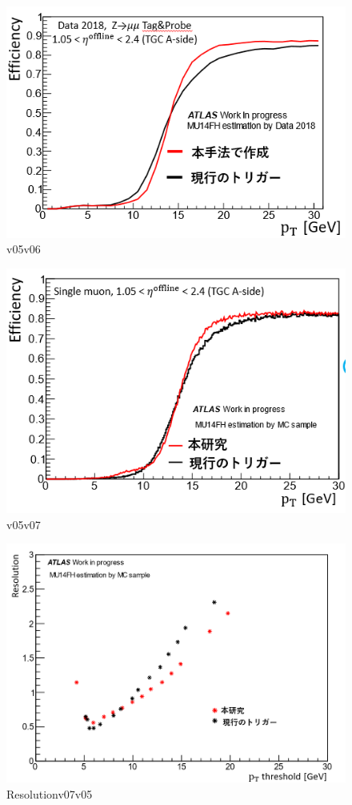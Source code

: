 \begin{figure}[tb]
  \centering
  \includegraphics[clip, width=12cm]{fig/4/hikaku_v05_v06.png}
  \caption{v05v06}
  \label{fig:v05v06}
\end{figure}

\begin{figure}[tb]
  \centering
  \includegraphics[clip, width=12cm]{fig/4/hikaku_v05_v07.png}
  \caption{v05v07}
  \label{fig:v05v07}
\end{figure}

\begin{figure}[tb]
  \centering
  \includegraphics[clip, width=12cm]{fig/4/resolution_v07_v05.png}
  \caption{Resolutionv07v05}
  \label{fig:Resolution_v07v05}
\end{figure}

